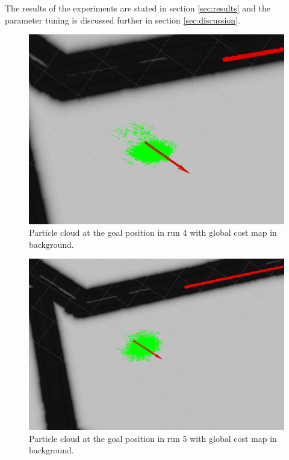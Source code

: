 \documentclass[10pt,journal,compsoc]{IEEEtran}
\begin{document}
The results of the experiments are stated in section \ref{sec:results} and the parameter tuning is discussed further in section \ref{sec:discussion}.

\begin{figure}[thpb]
      \centering
      \includegraphics[width=\linewidth]{images/run_4_goal.PNG}
      \caption{Particle cloud at the goal position in run 4 with global cost map in background.}
      \label{fig:result_experiment_4}
\end{figure}

\begin{figure}[thpb]
      \centering
      \includegraphics[width=\linewidth]{images/run_5_goal.PNG}
      \caption{Particle cloud at the goal position in run 5 with global cost map in background.}
      \label{fig:result_experiment_5}
\end{figure}
\end{document}
